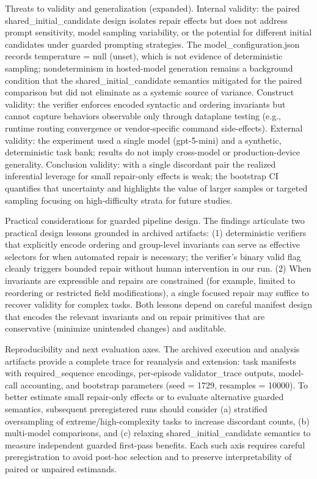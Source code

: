 \documentclass[conference]{IEEEtran}
\begin{document}
Threats to validity and generalization (expanded). Internal validity: the paired shared\_initial\_candidate design isolates repair effects but does not address prompt sensitivity, model sampling variability, or the potential for different initial candidates under guarded prompting strategies. The model\_configuration.json records temperature = null (unset), which is not evidence of deterministic sampling; nondeterminism in hosted-model generation remains a background condition that the shared\_initial\_candidate semantics mitigated for the paired comparison but did not eliminate as a systemic source of variance. Construct validity: the verifier enforces encoded syntactic and ordering invariants but cannot capture behaviors observable only through dataplane testing (e.g., runtime routing convergence or vendor-specific command side-effects). External validity: the experiment used a single model (gpt-5-mini) and a synthetic, deterministic task bank; results do not imply cross-model or production-device generality. Conclusion validity: with a single discordant pair the realized inferential leverage for small repair-only effects is weak; the bootstrap CI quantifies that uncertainty and highlights the value of larger samples or targeted sampling focusing on high-difficulty strata for future studies.

Practical considerations for guarded pipeline design. The findings articulate two practical design lessons grounded in archived artifacts: (1) deterministic verifiers that explicitly encode ordering and group-level invariants can serve as effective selectors for when automated repair is necessary; the verifier's binary valid flag cleanly triggers bounded repair without human intervention in our run. (2) When invariants are expressible and repairs are constrained (for example, limited to reordering or restricted field modifications), a single focused repair may suffice to recover validity for complex tasks. Both lessons depend on careful manifest design that encodes the relevant invariants and on repair primitives that are conservative (minimize unintended changes) and auditable.

Reproducibility and next evaluation axes. The archived execution and analysis artifacts provide a complete trace for reanalysis and extension: task manifests with required\_sequence encodings, per-episode validator\_trace outputs, model-call accounting, and bootstrap parameters (seed = 1729, resamples = 10000). To better estimate small repair-only effects or to evaluate alternative guarded semantics, subsequent preregistered runs should consider (a) stratified oversampling of extreme/high-complexity tasks to increase discordant counts, (b) multi-model comparisons, and (c) relaxing shared\_initial\_candidate semantics to measure independent guarded first-pass benefits. Each such axis requires careful preregistration to avoid post-hoc selection and to preserve interpretability of paired or unpaired estimands.
\end{document}
